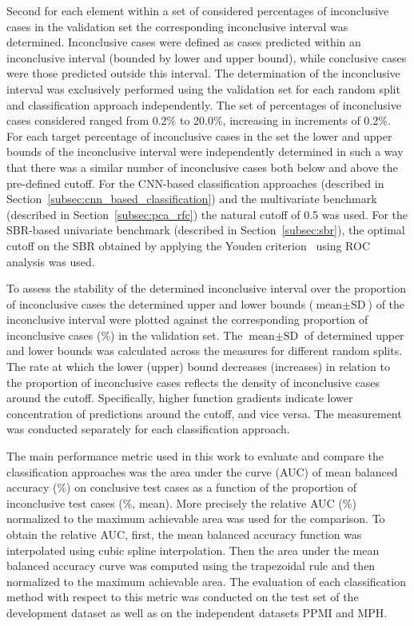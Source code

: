 Second for each element within a set of considered percentages of inconclusive cases in the validation set 
the corresponding inconclusive interval was determined.
Inconclusive cases were defined as cases predicted within an inconclusive interval 
(bounded by lower and upper bound), while conclusive cases were those predicted outside this interval.
The determination of the inconclusive interval was exclusively performed using the validation set 
for each random split and classification approach independently.
The set of percentages of inconclusive cases considered ranged from 0.2\% to 20.0\%, increasing in increments of 0.2\%.
For each target percentage of inconclusive cases in the set the lower and upper bounds of the inconclusive interval 
were independently determined in such a way that there was a similar number of inconclusive cases both below and above 
the pre-defined cutoff.
For the CNN-based classification approaches (described in Section~\ref{subsec:cnn_based_classification}) and the 
multivariate benchmark (described in Section~\ref{subsec:pca_rfc}) the natural cutoff of 0.5 was used.
For the SBR-based univariate benchmark (described in Section~\ref{subsec:sbr}), 
the optimal cutoff on the SBR obtained by applying the Youden criterion~\citep{Youden1950} using ROC analysis was used.

To assess the stability of the determined inconclusive interval over the proportion of inconclusive cases
the determined upper and lower bounds ($\text{mean} \pm \text{SD}$) of the inconclusive interval
were plotted against the corresponding proportion of inconclusive cases (\%) in the validation set.
The $\text{mean} \pm \text{SD}$ of determined upper and lower bounds was calculated across the measures for 
different random splits.
The rate at which the lower (upper) bound decreases (increases) in relation to the proportion of inconclusive 
cases reflects the density of inconclusive cases around the cutoff.
Specifically, higher function gradients indicate lower concentration of predictions around the cutoff, 
and vice versa.
The measurement was conducted separately for each classification approach.


The main performance metric used in this work to evaluate and compare the classification approaches was 
the area under the curve (AUC) of mean balanced accuracy (\%) on conclusive test cases as a function of 
the proportion of inconclusive test cases (\%, mean).
More precisely the relative AUC (\%) normalized to the maximum achievable area was used for the comparison.
To obtain the relative AUC, 
first, the mean balanced accuracy function was interpolated using cubic spline interpolation.
Then the area under the mean balanced accuracy curve was computed using the trapezoidal rule 
and then normalized to the maximum achievable area.
The evaluation of each classification method with respect to this metric was conducted on the test set of the 
development dataset as well as on the independent datasets PPMI and MPH.


